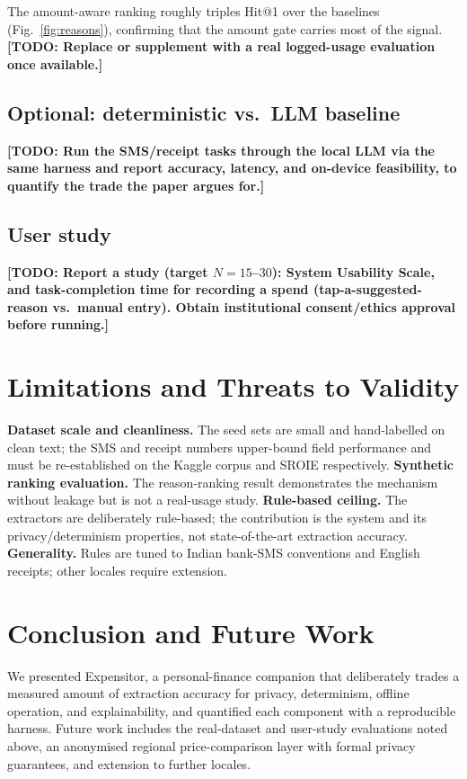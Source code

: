 \documentclass[conference]{IEEEtran}
\newcommand{\todo}[1]{{\color{red}\textbf{[TODO: #1]}}}
\begin{document}
The amount-aware ranking roughly triples Hit@1 over the baselines
(Fig.~\ref{fig:reasons}), confirming that the amount gate carries most of the
signal. \todo{Replace or supplement with a real logged-usage evaluation once
available.}

\subsection{Optional: deterministic vs.\ LLM baseline}
\todo{Run the SMS/receipt tasks through the local LLM via the same harness and
report accuracy, latency, and on-device feasibility, to quantify the trade the
paper argues for.}

\subsection{User study}
\todo{Report a study (target $N=15$--$30$): System Usability Scale, and
task-completion time for recording a spend (tap-a-suggested-reason vs.\ manual
entry). Obtain institutional consent/ethics approval before running.}

\section{Limitations and Threats to Validity}
\label{sec:limits}
\textbf{Dataset scale and cleanliness.} The seed sets are small and hand-labelled
on clean text; the SMS and receipt numbers upper-bound field performance and
must be re-established on the Kaggle corpus and SROIE respectively.
\textbf{Synthetic ranking evaluation.} The reason-ranking result demonstrates the
mechanism without leakage but is not a real-usage study.
\textbf{Rule-based ceiling.} The extractors are deliberately rule-based; the
contribution is the system and its privacy/determinism properties, not
state-of-the-art extraction accuracy.
\textbf{Generality.} Rules are tuned to Indian bank-SMS conventions and English
receipts; other locales require extension.

\section{Conclusion and Future Work}
We presented Expensitor, a personal-finance companion that deliberately trades a
measured amount of extraction accuracy for privacy, determinism, offline
operation, and explainability, and quantified each component with a reproducible
harness. Future work includes the real-dataset and user-study evaluations noted
above, an anonymised regional price-comparison layer with formal privacy
guarantees, and extension to further locales.
\end{document}
